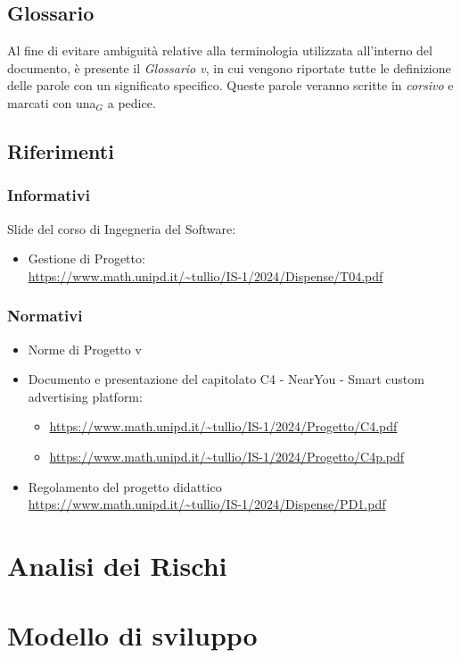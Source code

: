 \documentclass[12pt]{article}
\begin{document}
\subsection{Glossario}
Al fine di evitare ambiguità relative alla terminologia utilizzata all'interno del documento, è presente il \textit{Glossario v}, in cui vengono riportate tutte le definizione delle parole con un significato specifico. Queste parole veranno scritte in \textit{corsivo} e marcati con una$_G$ a pedice. 
\subsection{Riferimenti}
\subsubsection{Informativi}
Slide del corso di Ingegneria del Software:
\begin{itemize}
    \item Gestione di Progetto:\\ \url{https://www.math.unipd.it/~tullio/IS-1/2024/Dispense/T04.pdf}
\end{itemize}

\subsubsection{Normativi}
\begin{itemize}
\item Norme di Progetto v
    \item Documento e presentazione del capitolato C4 - NearYou - Smart custom advertising platform:
    \begin{itemize}
        \item \url{https://www.math.unipd.it/~tullio/IS-1/2024/Progetto/C4.pdf}
        \item \url{https://www.math.unipd.it/~tullio/IS-1/2024/Progetto/C4p.pdf}
    \end{itemize}
    \item Regolamento del progetto didattico\\ \url{https://www.math.unipd.it/~tullio/IS-1/2024/Dispense/PD1.pdf}
\end{itemize}
\newpage
\section{Analisi dei Rischi}
\newpage
\section{Modello di sviluppo}
\newpage
\end{document}

